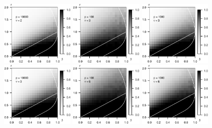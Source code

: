 \begin{figure}
      \includegraphics[width=0.32\textwidth]{sim_weak_boundary/simulated_weak_boundary_chi-squared_nu2_p10000.eps}
      \includegraphics[width=0.32\textwidth]{sim_weak_boundary/simulated_weak_boundary_chi-squared_nu3_p100.eps}
      \includegraphics[width=0.32\textwidth]{sim_weak_boundary/simulated_weak_boundary_chi-squared_nu3_p1000.eps}
      \includegraphics[width=0.32\textwidth]{sim_weak_boundary/simulated_weak_boundary_chi-squared_nu3_p10000.eps}
      \includegraphics[width=0.32\textwidth]{sim_weak_boundary/simulated_weak_boundary_chi-squared_nu6_p100.eps}
      \includegraphics[width=0.32\textwidth]{sim_weak_boundary/simulated_weak_boundary_chi-squared_nu6_p1000.eps}

\end{figure}
